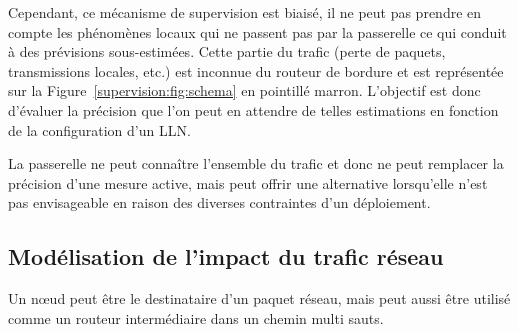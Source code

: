 
Cependant, ce mécanisme de supervision est biaisé, il ne peut pas prendre en compte les phénomènes locaux qui ne passent pas par la passerelle ce qui conduit à des prévisions sous-estimées.
Cette partie du trafic (perte de paquets, transmissions locales, etc.) est inconnue du routeur de bordure et est représentée sur la Figure~\ref{supervision:fig:schema} en pointillé marron.
L'objectif est donc d'évaluer la précision que l'on peut en attendre de telles estimations en fonction de la configuration d'un \ac{LLN}.


La passerelle ne peut connaître l'ensemble du trafic et donc ne peut remplacer la précision d'une mesure active, mais peut offrir une alternative lorsqu'elle n'est pas envisageable en raison des diverses contraintes d'un déploiement.

\subsection{Modélisation de l'impact du trafic réseau}

Un nœud peut être le destinataire d'un paquet réseau, mais peut aussi être utilisé comme un routeur intermédiaire dans un chemin multi sauts.

